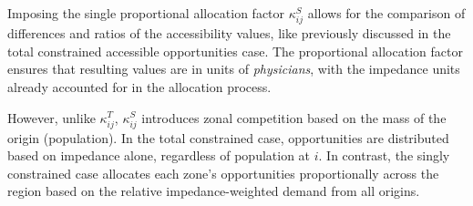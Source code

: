 \documentclass[
  10pt,
  letterpaper,
]{article}
\begin{document}
\begin{table}

\caption{\label{tbl-simple-example-attraction-constrained-accessibility}Simple
system: singly constrained accessible opportunities.}


\end{table}%

Imposing the single proportional allocation factor \(\kappa^S_{ij}\)
allows for the comparison of differences and ratios of the accessibility
values, like previously discussed in the total constrained accessible
opportunities case. The proportional allocation factor ensures that
resulting values are in units of \emph{physicians}, with the impedance
units already accounted for in the allocation process.

However, unlike \(\kappa^T_{ij}\), \(\kappa^S_{ij}\) introduces zonal
competition based on the mass of the origin (population). In the total
constrained case, opportunities are distributed based on impedance
alone, regardless of population at \(i\). In contrast, the singly
constrained case allocates each zone's opportunities proportionally
across the region based on the relative impedance-weighted demand from
all origins.
\end{document}
